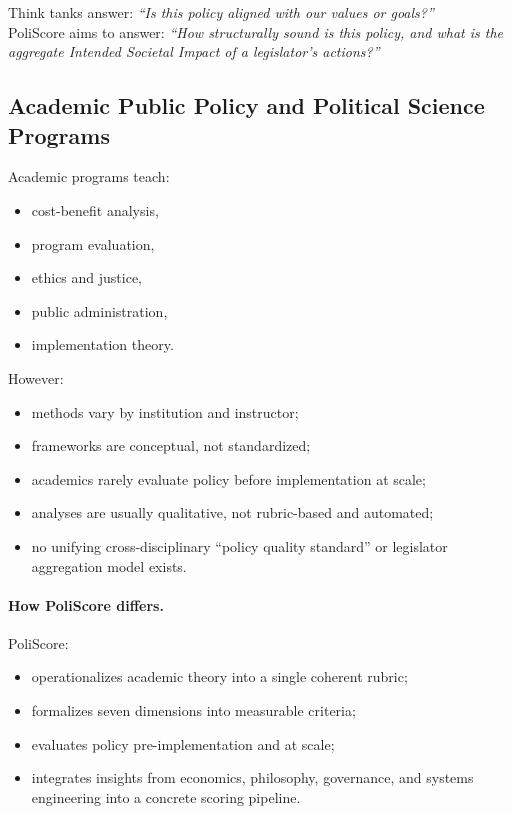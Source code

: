 \documentclass[12pt]{article}
\begin{document}
Think tanks answer: \textit{``Is this policy aligned with our values or goals?''}\\
PoliScore aims to answer: \textit{``How structurally sound is this policy, and what is the aggregate Intended Societal
Impact of a legislator's actions?''}

\subsection{Academic Public Policy and Political Science Programs}

Academic programs teach:

\begin{itemize}
    \item cost-benefit analysis,
    \item program evaluation,
    \item ethics and justice,
    \item public administration,
    \item implementation theory.
\end{itemize}

However:

\begin{itemize}
    \item methods vary by institution and instructor;
    \item frameworks are conceptual, not standardized;
    \item academics rarely evaluate policy before implementation at scale;
    \item analyses are usually qualitative, not rubric-based and automated;
    \item no unifying cross-disciplinary ``policy quality standard'' or legislator aggregation model exists.
\end{itemize}

\paragraph{How PoliScore differs.}

PoliScore:

\begin{itemize}
    \item operationalizes academic theory into a single coherent rubric;
    \item formalizes seven dimensions into measurable criteria;
    \item evaluates policy pre-implementation and at scale;
    \item integrates insights from economics, philosophy, governance, and systems engineering into a concrete scoring
    pipeline.
\end{itemize}
\end{document}
